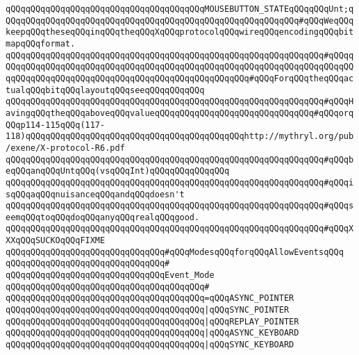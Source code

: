 \verb|qQQqqQQqqQQqqQQqqQQqqQQqqQQqqQQqqQQqqQQqMOUSEBUTTON_STATEqQQqqQQqUnt;qQQqqQQqqQQqqQQqqQQqqQQqqQQqqQQqqQQqqQQqqQQqqQQqqQQqqQQqqQQq#qQQqWeqQQqkeepqQQqtheseqQQqinqQQqtheqQQqXqQQqprotocolqQQqwireqQQqencodingqQQqbitmapqQQqformat.|\newline
\verb|qQQqqQQqqQQqqQQqqQQqqQQqqQQqqQQqqQQqqQQqqQQqqQQqqQQqqQQqqQQqqQQq#qQQqqQQqqQQqqQQqqQQqqQQqqQQqqQQqqQQqqQQqqQQqqQQqqQQqqQQqqQQqqQQqqQQqqQQqqQQqqQQqqQQqqQQqqQQqqQQqqQQqqQQqqQQqqQQqqQQqqQQqqQQq#qQQqForqQQqtheqQQqactualqQQqbitqQQqlayoutqQQqseeqQQqqQQqqQQq|\newline
\verb|qQQqqQQqqQQqqQQqqQQqqQQqqQQqqQQqqQQqqQQqqQQqqQQqqQQqqQQqqQQqqQQq#qQQqHavingqQQqtheqQQqaboveqQQqvalueqQQqqQQqqQQqqQQqqQQqqQQqqQQqqQQq#qQQqorqQQqp114-115qQQq(117-118)qQQqqQQqqQQqqQQqqQQqqQQqqQQqqQQqqQQqqQQqqQQqhttp://mythryl.org/pub/exene/X-protocol-R6.pdf|\newline
\verb|qQQqqQQqqQQqqQQqqQQqqQQqqQQqqQQqqQQqqQQqqQQqqQQqqQQqqQQqqQQqqQQq#qQQqbeqQQqanqQQqUntqQQq(vsqQQqInt)qQQqqQQqqQQqqQQq|\newline
\verb|qQQqqQQqqQQqqQQqqQQqqQQqqQQqqQQqqQQqqQQqqQQqqQQqqQQqqQQqqQQqqQQq#qQQqisqQQqaqQQqnuisanceqQQqandqQQqdoesn't|\newline
\verb|qQQqqQQqqQQqqQQqqQQqqQQqqQQqqQQqqQQqqQQqqQQqqQQqqQQqqQQqqQQqqQQq#qQQqseemqQQqtoqQQqdoqQQqanyqQQqrealqQQqgood.|\newline
\verb|qQQqqQQqqQQqqQQqqQQqqQQqqQQqqQQqqQQqqQQqqQQqqQQqqQQqqQQqqQQqqQQq#qQQqXXXqQQqSUCKOqQQqFIXME|\newline
\newline
\verb|qQQqqQQqqQQqqQQqqQQqqQQqqQQqqQQq#qQQqModesqQQqforqQQqAllowEventsqQQq|\newline
\verb|qQQqqQQqqQQqqQQqqQQqqQQqqQQqqQQq#|\newline
\verb|qQQqqQQqqQQqqQQqqQQqqQQqqQQqqQQqEvent_Mode|\newline
\verb|qQQqqQQqqQQqqQQqqQQqqQQqqQQqqQQqqQQqqQQq#|\newline
\verb|qQQqqQQqqQQqqQQqqQQqqQQqqQQqqQQqqQQqqQQq=qQQqASYNC_POINTER|\newline
\verb|qQQqqQQqqQQqqQQqqQQqqQQqqQQqqQQqqQQqqQQq|\verb#|qQQqSYNC_POINTER#\newline
\verb|qQQqqQQqqQQqqQQqqQQqqQQqqQQqqQQqqQQqqQQq|\verb#|qQQqREPLAY_POINTER#\newline
\verb|qQQqqQQqqQQqqQQqqQQqqQQqqQQqqQQqqQQqqQQq|\verb#|qQQqASYNC_KEYBOARD#\newline
\verb|qQQqqQQqqQQqqQQqqQQqqQQqqQQqqQQqqQQqqQQq|\verb#|qQQqSYNC_KEYBOARD#\newline
